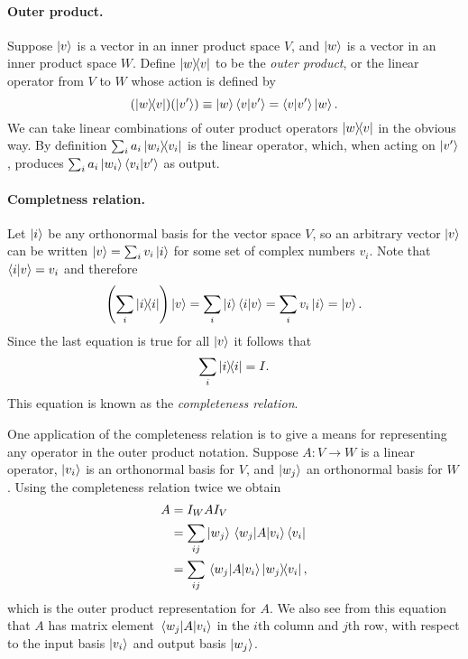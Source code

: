 \paragraph{Outer product.} Suppose $\ket{v}$ is a vector in an inner product
space $V$, and $\ket{w}$ is a vector in an inner product space $W$. Define
$\ketbra{w}{v}$ to be the \emph{outer product}, or the linear operator from $V$
to $W$ whose action is defined by \begin{equation}
  (\ketbra{w}{v})(\ket{v'}) \equiv \ket{w}\braket{v}{v'} = \braket{v}{v'}
    \ket{w}. \label{eq:out-prod}
\end{equation} We can take linear combinations of outer product operators
$\ketbra{w}{v}$ in the obvious way. By definition $\sum_i a_i
\ketbra{w_i}{v_i}$ is the linear operator, which, when acting on $\ket{v'}$,
produces $\sum_i a_i\ket{w_i} \braket{v_i}{v'}$ as output.

\paragraph{Completness relation.} Let $\ket{i}$ be any orthonormal basis for
the vector space $V$, so an arbitrary vector $\ket{v}$ can be written $\ket{v}
= \sum_i v_i\ket{i}$ for some set of complex numbers $v_i$. Note that
$\braket{i}{v} = v_i$ and therefore \begin{equation*}
  \left(\sum_i \ketbra{i}{i}\right)\ket{v} = \sum_i \ket{i}\braket{i}{v} =
    \sum_i v_i\ket{i} = \ket{v}.
\end{equation*} Since the last equation is true for all $\ket{v}$ it follows
that \begin{equation} \label{eq:comp-rel}
  \sum_i \ketbra{i}{i} = I.
\end{equation} This equation is known as the \emph{completeness relation}.

One application of the completeness relation is to give a means for
representing any operator in the outer product notation. Suppose $A : V
\rightarrow W$ is a linear operator, $\ket{v_i}$ is an orthonormal basis for
$V$, and $\ket{w_j}$ an orthonormal basis for $W$. Using the completeness
relation twice we obtain \begin{align}
  A &= I_WAI_V \nonumber \\
    &= \sum_{ij} \ket{w_j}\mel{w_j}{A}{v_i}\bra{v_i} \nonumber \\
    &= \sum_{ij} \mel{w_j}{A}{v_i}\ketbra{w_j}{v_i}, \label{eq:out-prod-rep}
\end{align} which is the outer product representation for $A$. We also see from
this equation that $A$ has matrix element $\mel{w_j}{A}{v_i}$ in the $i$th
column and $j$th row, with respect to the input basis $\ket{v_i}$ and output
basis $\ket{w_j}$.

